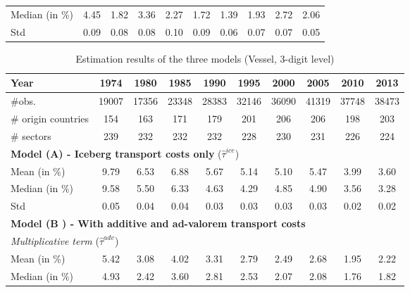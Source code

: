 \documentclass[11pt,twoside, authoryear]{elsarticle}
\begin{document}
\begin{table}[htbp]
{\begin{tabular}{l|c c c c c c c c c}
    Median (in \%)& \multicolumn{1}{c}{4.45} & \multicolumn{1}{c}{1.82} & \multicolumn{1}{c}{3.36} & \multicolumn{1}{c}{2.27} & \multicolumn{1}{c}{1.72} & \multicolumn{1}{c}{1.39} & \multicolumn{1}{c}{1.93} & \multicolumn{1}{c}{2.72} & \multicolumn{1}{c}{2.06} \\
    Std & \multicolumn{1}{c}{0.09} & \multicolumn{1}{c}{0.08} & \multicolumn{1}{c}{0.08} & \multicolumn{1}{c}{0.10} & \multicolumn{1}{c}{0.09} & \multicolumn{1}{c}{0.06} & \multicolumn{1}{c}{0.07} & \multicolumn{1}{c}{0.07} & \multicolumn{1}{c}{0.05} \\  \hline \hline
    \end{tabular}
    }
\end{table}%


\begin{table}[htbp]
  \centering
   \footnotesize{
    \caption{Estimation results of the three models (Vessel, 3-digit level)}
  \label{tab:3models_estimation_results_vessel}%
    \begin{tabular}{l|c c c c c c c c c}
    \hline \hline
    \textbf{Year} & 1974  & 1980  & 1985  & 1990  & 1995  & 2000  & 2005  & 2010  & 2013 \\ \hline
    $\# $obs. & 19007 & 17356 & 23348 & 28383 & 32146 & 36090 & 41319 & 37748 & 38473 \\
    $\#$  origin countries & 154   & 163   & 171   & 179   & 201   & 206   & 206   & 198   & 203 \\
    $\#$  sectors & 239   & 232   & 232   & 232   & 228   & 230   & 231   & 226   & 224 \\ \hline
    \multicolumn{10}{l}{\textbf{Model (A) - Iceberg transport costs only} ($\widehat{\tau}^{ice}$)} \\ \hline
    Mean (in \%) & 9.79  & 6.53  & 6.88  & 5.67  & 5.14  & 5.10  & 5.47  & 3.99  & 3.60 \\
    Median (in \%)& 9.58  & 5.50  & 6.33  & 4.63  & 4.29  & 4.85  & 4.90  & 3.56  & 3.28 \\
    Std & 0.05  & 0.04  & 0.04  & 0.03  & 0.03  & 0.03  & 0.03  & 0.02  & 0.02 \\ \hline
    \multicolumn{10}{l}{\textbf{Model (B ) - With additive and ad-valorem transport costs} } \\ \hline
     \multicolumn{10}{l}{\textit{Multiplicative term} ($\widehat{\tau}^{adv}$)} \\ \hline
    Mean (in \%) & 5.42  & 3.08  & 4.02  & 3.31  & 2.79  & 2.49  & 2.68  & 1.95  & 2.22 \\
    Median (in \%) & 4.93  & 2.42  & 3.60  & 2.81  & 2.53  & 2.07  & 2.08  & 1.76  & 1.82 \\

\end{tabular}}
\end{table}
\end{document}
